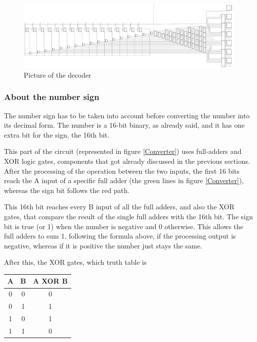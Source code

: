 \documentclass{article}
\begin{document}
\begin{figure}[h]
    \centering
    \includegraphics[scale=0.42]{SC_Decoder}
    \caption{Picture of the decoder}
    \label{Decoder}
  \end{figure}

\subsubsection{About the number sign}

The number sign has to be taken into account before converting the number into its decimal form. The number is a 16-bit binary, as already said, and it has one extra bit for the sign, the 16th bit.


This part of the circuit (represented in figure \ref{Converter}) uses full-adders and XOR logic gates, components that got already discussed in the previous sections. After the processing of the operation between the two inputs, the first 16 bits reach the A input of a specific full adder (the green lines in figure \ref{Converter}), whereas the sign bit follows the red path.

This 16th bit reaches every B input of all the full adders, and also the XOR gates, that compare the result of the single full adders with the 16th bit. The sign bit is true (or 1) when the number is negative and 0 otherwise. This allows the full adders to sum 1, following the formula above, if the processing output is negative, whereas if it is positive the number just stays the same.

After this, the XOR gates, which truth table is 
\begin{center}
\begin{tabular}{||c|c||c||}
    \hline
    A & B & A XOR B \\
    \hline
    0 & 0 & 0 \\
    \hline
    0 & 1 & 1 \\
    \hline
    1 & 0 & 1 \\
    \hline
    1 & 1 & 0 \\
    \hline
\end{tabular}
\end{center}
\end{document}
